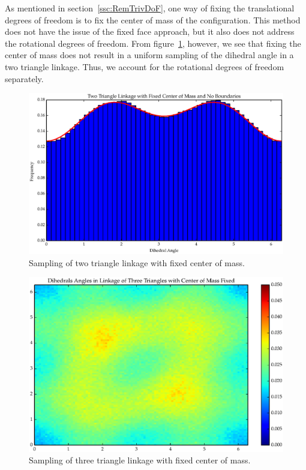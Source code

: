 As mentioned in section~\ref{ssc:RemTrivDoF}, one way of fixing the translational degrees of freedom is to fix the center of mass of the configuration. This method does not have the issue of the fixed face approach, but it also does not address the rotational degrees of freedom. From figure~\ref{fig:T2_4}, however, we see that fixing the center of mass does not result in a uniform sampling of the dihedral angle in a two triangle linkage. Thus, we account for the rotational degrees of freedom separately.  
\begin{figure}[ht]
\centering
  \includegraphics[scale=0.6]{images/T2_4.eps}
\caption{Sampling of two triangle linkage with fixed center of mass.}
\label{fig:T2_4}
\end{figure}

\begin{figure}[ht]
\centering
  \includegraphics[scale=0.6]{images/T3_5_2D.eps}
\caption{Sampling of three triangle linkage with fixed center of mass.}
\label{fig:T3_5}
\end{figure}

